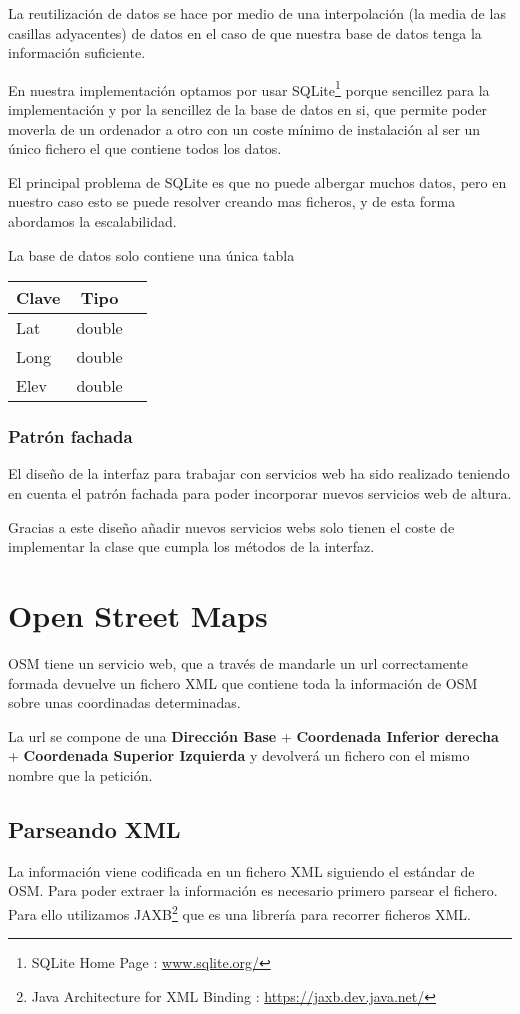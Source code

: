 La reutilización de datos se hace por medio de una interpolación (la media de
las casillas adyacentes) de datos en el caso de que nuestra base de datos tenga
la información suficiente.

En nuestra implementación optamos por usar  SQLite\footnote{SQLite Home Page :
\url{www.sqlite.org/}} porque sencillez para la
implementación y por la sencillez de la base de datos en si, que permite poder
moverla de un ordenador a otro con un coste mínimo de instalación al ser un
único fichero el que contiene todos los datos.

El principal problema de SQLite es que no puede albergar muchos datos, pero en
nuestro caso esto se puede resolver creando mas ficheros, y de esta forma
abordamos la escalabilidad.

La base de datos solo contiene una única tabla
\begin{center}
\begin{tabular}{ | l | c | r | }
\hline
Clave & Tipo \\ \hline
Lat & double \\ \hline
Long & double \\ \hline
Elev & double \\ \hline
\end{tabular}
\end{center}


\subsubsection*{Patrón fachada}
El diseño de la interfaz para trabajar con servicios web ha sido realizado
teniendo en cuenta el patrón fachada para poder incorporar nuevos servicios web
de altura.

Gracias a este diseño añadir nuevos servicios webs solo tienen el coste de
implementar la clase que cumpla los métodos de la interfaz.
\section*{Open Street Maps}
OSM tiene un servicio web, que a través de mandarle un url correctamente
formada devuelve un fichero XML que contiene toda la información de OSM sobre
unas coordinadas determinadas.

La url se compone de una {\bf Dirección Base} + {\bf Coordenada Inferior
 derecha} + {\bf Coordenada Superior Izquierda} y devolverá un fichero con el
mismo nombre que la petición.
\subsection*{Parseando XML}
La información viene codificada en un fichero XML siguiendo el estándar de OSM.
Para poder extraer la información es necesario primero parsear el fichero.
Para ello utilizamos JAXB\footnote{Java Architecture for XML Binding :
\url{https://jaxb.dev.java.net/}} que es una librería para recorrer ficheros
XML. 

